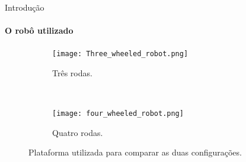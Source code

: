 \begin{frame}[t]{Introdução}
  \framesubtitle{O robô utilizado}
  \transdissolve[duration=0.5]

  \begin{figure}[ht!]
    \centering
    \begin{subfigure}[b]{0.3\textwidth}
      \texttt{[image: Three\_wheeled\_robot.png]}
      \caption{Três rodas.}
      \label{fig:3_wheels_robot}
    \end{subfigure}
    ~
    \begin{subfigure}[b]{0.3\textwidth}
      \texttt{[image: four\_wheeled\_robot.png]}
      \caption{Quatro rodas.}
      \label{fig:4_wheels_robot}
    \end{subfigure}
    
  \caption{ Plataforma utilizada para comparar as duas configurações. \cite{Oliveira2008}}
  \end{figure}
  
\end{frame}

